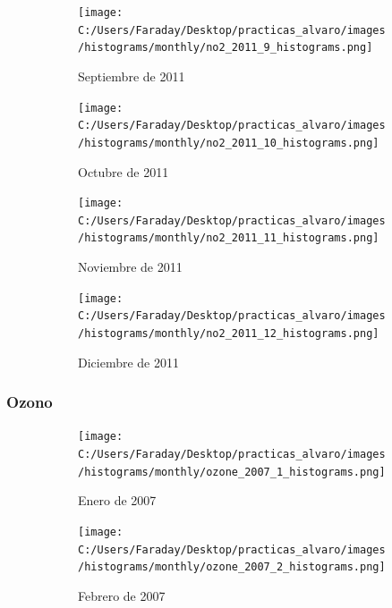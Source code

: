 \documentclass[12pt]{article}
\begin{document}
\begin{figure}[H]
\centering
\begin{subfigure}[h]{0.45\textwidth}
\texttt{[image: C:/Users/Faraday/Desktop/practicas\_alvaro/images/histograms/monthly/no2\_2011\_9\_histograms.png]}
\caption{Septiembre de 2011}
\label{fig:hist-mon-1-9-2011}
\end{subfigure}
%
\begin{subfigure}[H]{0.45\textwidth}
\texttt{[image: C:/Users/Faraday/Desktop/practicas\_alvaro/images/histograms/monthly/no2\_2011\_10\_histograms.png]}
\caption{Octubre de 2011}
\label{fig:hist-mon-1-10-2011}
\end{subfigure}
\caption{}
\end{figure}

\begin{figure}[H]
\centering
\begin{subfigure}[h]{0.45\textwidth}
\texttt{[image: C:/Users/Faraday/Desktop/practicas\_alvaro/images/histograms/monthly/no2\_2011\_11\_histograms.png]}
\caption{Noviembre de 2011}
\label{fig:hist-mon-1-11-2011}
\end{subfigure}
%
\begin{subfigure}[H]{0.45\textwidth}
\texttt{[image: C:/Users/Faraday/Desktop/practicas\_alvaro/images/histograms/monthly/no2\_2011\_12\_histograms.png]}
\caption{Diciembre de 2011}
\label{fig:hist-mon-1-12-2011}
\end{subfigure}
\caption{}
\end{figure}

\newpage

\subsubsection*{Ozono}
%

\begin{figure}[H]
\centering
\begin{subfigure}[h]{0.45\textwidth}
\texttt{[image: C:/Users/Faraday/Desktop/practicas\_alvaro/images/histograms/monthly/ozone\_2007\_1\_histograms.png]}
\caption{Enero de 2007}
\label{fig:hist-mon-2-1-2007}
\end{subfigure}
%
\begin{subfigure}[H]{0.45\textwidth}
\texttt{[image: C:/Users/Faraday/Desktop/practicas\_alvaro/images/histograms/monthly/ozone\_2007\_2\_histograms.png]}
\caption{Febrero de 2007}
\label{fig:hist-mon-2-2-2007}
\end{subfigure}
\caption{}
\end{figure}
\end{document}
